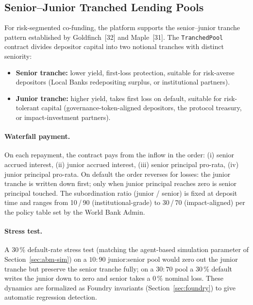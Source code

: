 \documentclass[12pt,a4paper]{report}
\begin{document}
\subsection{Senior--Junior Tranched Lending Pools}
\label{sec:tranched-pools}

For risk-segmented co-funding, the platform supports the senior--junior tranche pattern established by Goldfinch~[32] and Maple~[31]. The \texttt{TranchedPool} contract divides depositor capital into two notional tranches with distinct seniority:

\begin{itemize}[noitemsep]
\item \textbf{Senior tranche:} lower yield, first-loss protection, suitable for risk-averse depositors (Local Banks redepositing surplus, or institutional partners).
\item \textbf{Junior tranche:} higher yield, takes first loss on default, suitable for risk-tolerant capital (governance-token-aligned depositors, the protocol treasury, or impact-investment partners).
\end{itemize}

\paragraph{Waterfall payment.}
On each repayment, the contract pays from the inflow in the order: (i) senior accrued interest, (ii) junior accrued interest, (iii) senior principal pro-rata, (iv) junior principal pro-rata. On default the order reverses for losses: the junior tranche is written down first; only when junior principal reaches zero is senior principal touched. The subordination ratio (junior / senior) is fixed at deposit time and ranges from 10\,/\,90 (institutional-grade) to 30\,/\,70 (impact-aligned) per the policy table set by the World Bank Admin.

\paragraph{Stress test.}
A 30\,\% default-rate stress test (matching the agent-based simulation parameter of Section~\ref{sec:abm-sim}) on a $10:90$ junior:senior pool would zero out the junior tranche but preserve the senior tranche fully; on a $30:70$ pool a 30\,\% default writes the junior down to zero and senior takes a 0\,\% nominal loss. These dynamics are formalized as Foundry invariants (Section~\ref{sec:foundry}) to give automatic regression detection.
\end{document}
